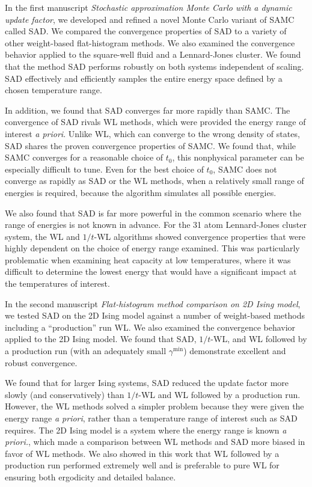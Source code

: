In the first manuscript \emph{Stochastic approximation Monte Carlo with a
dynamic update factor}, we developed and refined a novel Monte Carlo variant of
SAMC called SAD. We compared the convergence properties of SAD to a variety of
other weight-based flat-histogram methods. We also examined the convergence
behavior applied to the square-well fluid and a Lennard-Jones cluster. We found
that the method SAD performs robustly on both systems independent of
scaling. SAD effectively and efficiently samples the entire energy space defined
by a chosen temperature range.

In addition, we found that SAD converges far more rapidly than SAMC. The
convergence of SAD rivals WL methods, which were provided the energy range of
interest \emph{a priori}. Unlike WL, which can converge to the wrong density of
states, SAD shares the proven convergence properties of SAMC. We found that,
while SAMC converges for a reasonable choice of $t_0$, this nonphysical
parameter can be especially difficult to tune. Even for the best choice of
$t_0$, SAMC does not converge as rapidly as SAD or the WL methods, when a
relatively small range of energies is required, because the algorithm simulates
all possible energies.

We also found that SAD is far more powerful in the common scenario where the
range of energies is not known in advance. For the 31 atom Lennard-Jones
cluster system, the WL and $1/t$-WL algorithms showed convergence properties
that were highly dependent on the choice of energy range examined. This was
particularly problematic when examining heat capacity at low temperatures,
where it was difficult to determine the lowest energy that would have a
significant impact at the temperatures of interest.

In the second manuscript \emph{Flat-histogram method comparison on 2D Ising
model}, we tested SAD on the 2D Ising model against a number of weight-based
methods including a ``production'' run WL. We also examined the convergence
behavior applied to the 2D Ising model. We found that SAD, $1/t$-WL, and WL
followed by a production run (with an adequately small $\gamma^{\min}$)
demonstrate excellent and robust convergence.

We found that for larger Ising systems, SAD reduced the update factor more
slowly (and conservatively) than $1/t$-WL and WL followed by a production run.
However, the WL methods solved a simpler problem because they were given the
energy range \emph{a priori}, rather than a temperature range of interest such
as SAD requires. The 2D Ising model is a system where the energy range is known
\emph{a priori.}, which made a comparison between WL methods and SAD more
biased in favor of WL methods. We also showed in this work that WL followed by
a production run performed extremely well and is preferable to pure WL for
ensuring both ergodicity and detailed balance.

